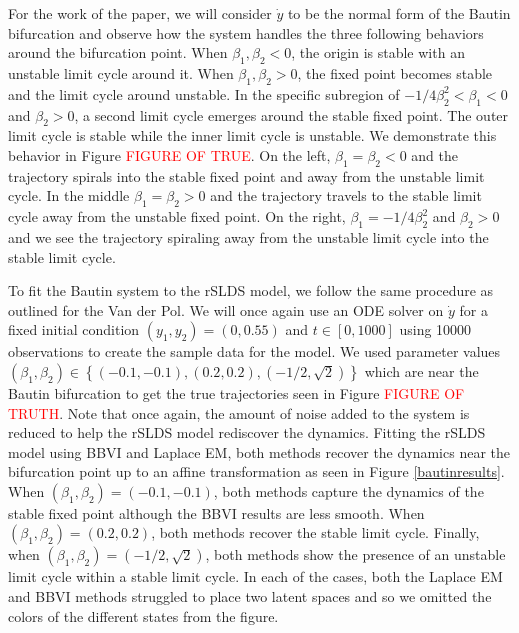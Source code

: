 For the work of the paper, we will consider $\dot{y}$ to be the normal form of the Bautin bifurcation and observe how the system handles the three following behaviors around the bifurcation point. When $\beta_1,\beta_2 < 0$, the origin is stable with an unstable limit cycle around it. When $\beta_1,\beta_2 > 0$, the fixed point becomes stable and the limit cycle around unstable. In the specific subregion of $-1/4 \beta_2^2 < \beta_1 < 0$ and $\beta_2>0$, a second limit cycle emerges around the stable fixed point. The outer limit cycle is stable while the inner limit cycle is unstable. We demonstrate this behavior in Figure \textcolor{red}{FIGURE OF TRUE}. On the left, $\beta_1 = \beta_2 < 0$ and the trajectory spirals into the stable fixed point and away from the unstable limit cycle. In the middle $\beta_1 = \beta_2 > 0$ and the trajectory travels to the stable limit cycle away from the unstable fixed point. On the right, $\beta_1 = -1/4 \beta_2^2$ and $\beta_2 > 0$ and we see the trajectory spiraling away from the unstable limit cycle into the stable limit cycle. 

To fit the Bautin system to the rSLDS model, we follow the same procedure as outlined for the Van der Pol. We will once again use an ODE solver on $\dot{y}$ for a fixed initial condition $(y_1,y_2) = (0,0.55)$ and $t\in[0,1000]$ using 10000 observations to create the sample data for the model. We used parameter values $(\beta_1,\beta_2) \in \left\{(-0.1,-0.1),(0.2,0.2),\left(-1/2,\sqrt{2}\right)\right\}$ which are near the Bautin bifurcation to get the true trajectories seen in Figure \textcolor{red}{FIGURE OF TRUTH}. Note that once again, the amount of noise added to the system is reduced to help the rSLDS model rediscover the dynamics. Fitting the rSLDS model using BBVI and Laplace EM, both methods recover the dynamics near the bifurcation point up to an affine transformation as seen in Figure \ref{bautinresults}. When $(\beta_1,\beta_2) = (-0.1,-0.1)$, both methods capture the dynamics of the stable fixed point although the BBVI results are less smooth. When $(\beta_1,\beta_2) = (0.2,0.2)$, both methods recover the stable limit cycle. Finally, when $(\beta_1,\beta_2) = (-1/2,\sqrt{2})$, both methods show the presence of an unstable limit cycle within a stable limit cycle. In each of the cases, both the Laplace EM and BBVI methods struggled to place two latent spaces and so we omitted the colors of the different states from the figure.  

